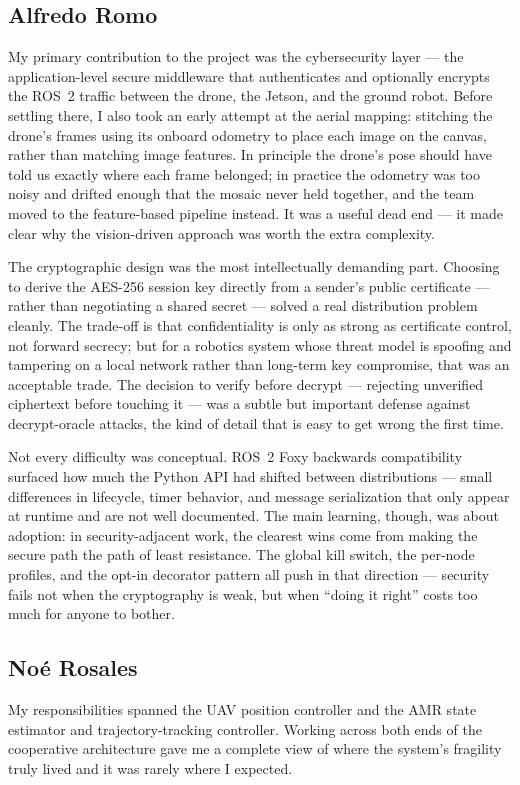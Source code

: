 \documentclass[11pt]{article}
\begin{document}
\subsection*{Alfredo Romo}
My primary contribution to the project was the cybersecurity layer --- the
application-level secure middleware that authenticates and optionally encrypts the
ROS~2 traffic between the drone, the Jetson, and the ground robot. Before settling
there, I also took an early attempt at the aerial mapping: stitching the drone's
frames using its onboard odometry to place each image on the canvas, rather than
matching image features. In principle the drone's pose should have told us exactly
where each frame belonged; in practice the odometry was too noisy and drifted
enough that the mosaic never held together, and the team moved to the
feature-based pipeline instead. It was a useful dead end --- it made clear why the
vision-driven approach was worth the extra complexity.

The cryptographic design was the most intellectually demanding part. Choosing to
derive the AES-256 session key directly from a sender's public certificate ---
rather than negotiating a shared secret --- solved a real distribution problem
cleanly. The trade-off is that confidentiality is only as strong as certificate
control, not forward secrecy; but for a robotics system whose threat model is
spoofing and tampering on a local network rather than long-term key compromise,
that was an acceptable trade. The decision to verify before decrypt --- rejecting
unverified ciphertext before touching it --- was a subtle but important defense
against decrypt-oracle attacks, the kind of detail that is easy to get wrong the
first time.

Not every difficulty was conceptual. ROS~2 Foxy backwards compatibility surfaced
how much the Python API had shifted between distributions --- small differences in
lifecycle, timer behavior, and message serialization that only appear at runtime
and are not well documented. The main learning, though, was about adoption: in
security-adjacent work, the clearest wins come from making the secure path the
path of least resistance. The global kill switch, the per-node profiles, and the
opt-in decorator pattern all push in that direction --- security fails not when
the cryptography is weak, but when ``doing it right'' costs too much for anyone to
bother.
\vspace{4em}

\subsection*{Noé Rosales}
My responsibilities spanned the UAV position controller and the AMR state estimator and trajectory-tracking controller. Working across both ends of the cooperative architecture gave me a complete view of where the system's fragility truly lived  and it was rarely where I expected.
\end{document}
